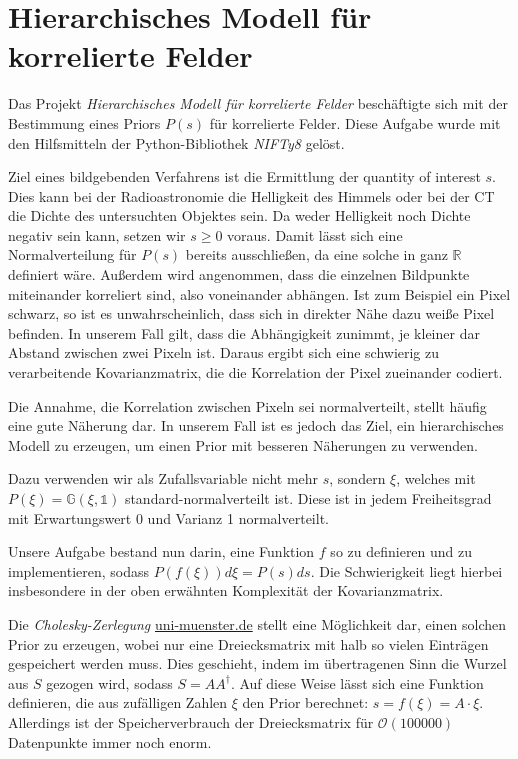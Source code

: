 \section{Hierarchisches Modell für korrelierte Felder}\label{k4.2.hmodel}
Das Projekt \emph{Hierarchisches Modell für korrelierte Felder} beschäftigte sich mit der Bestimmung eines Priors $P(s)$ für korrelierte Felder. Diese Aufgabe wurde mit den Hilfsmitteln der Python-Bibliothek \emph{NIFTy8} gelöst.

Ziel eines bildgebenden Verfahrens ist die Ermittlung der quantity of interest $s$. Dies kann bei der Radioastronomie die Helligkeit des Himmels oder bei der CT die Dichte des untersuchten Objektes sein. Da weder Helligkeit noch Dichte negativ sein kann, setzen wir $s \geq 0$ voraus. Damit lässt sich eine Normalverteilung für $P(s)$ bereits ausschließen, da eine solche in ganz $\mathbb{R}$ definiert wäre. Außerdem wird angenommen, dass die einzelnen Bildpunkte miteinander korreliert sind, also voneinander abhängen. Ist zum Beispiel ein Pixel schwarz, so ist es unwahrscheinlich, dass sich in direkter Nähe dazu weiße Pixel befinden. In unserem Fall gilt, dass die Abhängigkeit zunimmt, je kleiner dar Abstand zwischen zwei Pixeln ist. Daraus ergibt sich eine schwierig zu verarbeitende Kovarianzmatrix, die die Korrelation der Pixel zueinander codiert.

Die Annahme, die Korrelation zwischen Pixeln sei normalverteilt, stellt häufig eine gute Näherung dar. In unserem Fall ist es jedoch das Ziel, ein hierarchisches Modell zu erzeugen, um einen Prior mit besseren Näherungen zu verwenden.

Dazu verwenden wir als Zufallsvariable nicht mehr $s$, sondern $\xi$, welches mit $P(\xi) = \mathbb{G}(\xi, \mathds{1})$ standard-normalverteilt ist. Diese ist in jedem Freiheitsgrad mit Erwartungswert 0 und Varianz 1 normalverteilt.

Unsere Aufgabe bestand nun darin, eine Funktion $f$ so zu definieren und zu implementieren, sodass $P(f(\xi)) d \xi = P(s) ds$. Die Schwierigkeit liegt hierbei insbesondere in der oben erwähnten Komplexität der Kovarianzmatrix.

Die \emph{Cholesky-Zerlegung} \href{https://www.uni-muenster.de/AMM/num/Vorlesungen/Numerik1_WS06/loesungen06/Prog_cholesky.pdf}{uni-muenster.de}
stellt eine Möglichkeit dar, einen solchen Prior zu erzeugen, wobei nur eine Dreiecksmatrix mit halb so vielen Einträgen gespeichert werden muss. Dies geschieht, indem im übertragenen Sinn die Wurzel aus $S$ gezogen wird, sodass $S=A A^{\dagger}$. Auf diese Weise lässt sich eine Funktion definieren, die aus zufälligen Zahlen $\xi$ den Prior berechnet: $s = f(\xi) = A \cdot \xi$. Allerdings ist der Speicherverbrauch der Dreiecksmatrix für $\mathcal{O}(100 000)$ Datenpunkte immer noch enorm.

